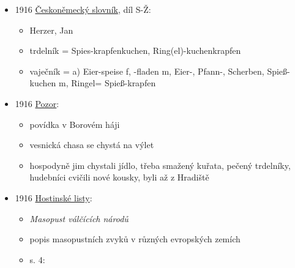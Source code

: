 \begin{itemize}
  \begin{itemize}
  \tightlist
  \item
    č. 7, s. 15
  \item
    \emph{Zimní praktické běhy vaření a prací hospodyňských pro žákyně
    hospodářského kursu pokračovacího v Hořicích}
  \item
    jídelní lístky a výklad nauky o potravinách a domácím hospodářství

    \begin{itemize}
    \tightlist
    \item
      20. Polévka zasmažená, s hrachovým svítkem, císařská kýta, plněné
      placičky, trdelník
    \end{itemize}
  \end{itemize}
\item
  1916
  \href{https://ceskadigitalniknihovna.cz/uuid/uuid:57d4bfd0-7b1f-11e3-a80c-005056825209}{Českoněmecký
  slovník}, díl S-Ž:

  \begin{itemize}
  \tightlist
  \item
    Herzer, Jan
  \item
    trdelník = Spies-krapfen\textbar kuchen,
    Ring(el)-kuchen\textbar krapfen
  \item
    vaječník = a) Eier-speise f, -fladen m, Eier-, Pfann-, Scherben,
    Spieß-kuchen m, Ringel= Spieß-krapfen
  \end{itemize}
\item
  1916
  \href{https://www.digitalniknihovna.cz/vkol/uuid/uuid:ba9e05d7-c361-4172-ac80-4e6b94a378fb}{Pozor}:

  \begin{itemize}
  \tightlist
  \item
    povídka v Borovém háji
  \item
    vesnická chasa se chystá na výlet
  \item
    hospodyně jim chystali jídlo, třeba smažený kuřata, pečený
    trdelníky, hudebníci cvičili nové kousky, byli až z Hradiště
  \end{itemize}
\item
  1916
  \href{https://ceskadigitalniknihovna.cz/uuid/uuid:07149bfb-4c77-4423-8287-3755c2358490}{Hostinské
  listy}:

  \begin{itemize}
  \tightlist
  \item
    \emph{Masopust válčících národů}
  \item
    popis masopustních zvyků v různých evropských zemích
  \item
    s. 4:


\end{itemize}
\end{itemize}
